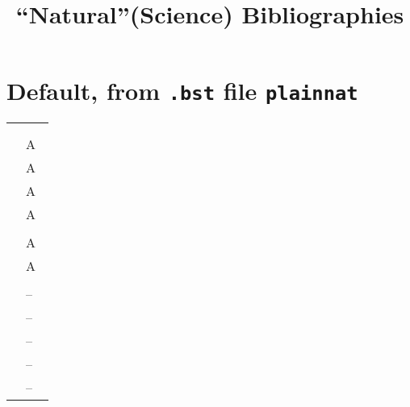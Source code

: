 \documentclass{article}
\begin{document}
\title{``Natural''(Science)  Bibliographies}
\author{}
\date{}
\maketitle

\newcommand{\zyva}
{\begin{center}
\begin{tabular}{p{.4\linewidth}@{\quad\ensuremath{\Rightarrow}\quad}p{.4\linewidth}}
\url+\citet{MPW92}+ & \citet{MPW92}\\
\url+\citet[chap.~2]{MPW92}+ & \citet[chap.~2]{MPW92}\\
\url+\citep{MPW92}+ & A~\citep{MPW92}\\
\url+\citep[chap.~2]{MPW92}+ & A~\citep[chap.~2]{MPW92}\\
\url+\citep[see][]{MPW92}+ & A~\citep[see][]{MPW92}\\
\url+\citep[see][chap.~2]{MPW92}+ & A~\citep[see][chap.~2]{MPW92}\\
\url+\citet*{MPW92}+ & \citet*{MPW92}\\
\url+\citep*{MPW92}+ & A~\citep*{MPW92}\\
\url+\citep[chap.~2]{MPW92,odersky:esop2000}+ & A~\citep[chap.~2]{MPW92,odersky:esop2000} \\
\url+\citet[chap.~2]{MPW92,odersky:esop2000}+ &\citet[chap.~2]{MPW92,odersky:esop2000} \\
\url+\citenum{MPW92}--\citenum{MPW92,odersky:esop2000}+ &
\citenum{MPW92}--\citenum{MPW92,odersky:esop2000}\\
\url+\citeauthor{MPW92}--\citeauthor{MPW92,odersky:esop2000}+ &
\citeauthor{MPW92}--\citeauthor{MPW92,odersky:esop2000}\\
\url+\citeauthor*{MPW92}--\citeauthor*{MPW92,odersky:esop2000}+ &
\citeauthor*{MPW92}--\citeauthor*{MPW92,odersky:esop2000}\\
\url+\citeyear{MPW92}--\citeyear{MPW92,odersky:esop2000}+ &
\citeyear{MPW92}--\citeyear{MPW92,odersky:esop2000}\\
\url+\citeyearpar{MPW92}--\citeyearpar{MPW92,odersky:esop2000}+ &
\citeyearpar{MPW92}--\citeyearpar{MPW92,odersky:esop2000}\\
\end{tabular}
\end{center}
\printindex}

\section{Default, from \texttt{.bst} file \texttt{plainnat}}
\zyva
\end{document}
